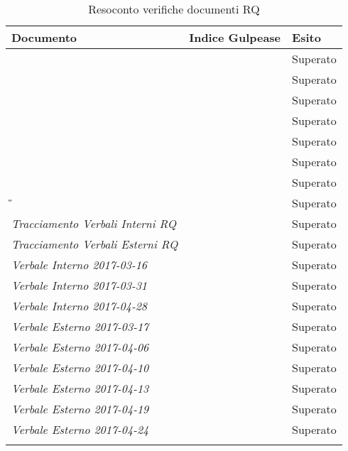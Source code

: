 			\begin{longtable}{|>{\centering\arraybackslash}p{5cm}|>{\centering\arraybackslash}p{5cm} | >{\centering\arraybackslash}p{5cm}|}
				\hline
				\rowcolor{Gray}
				\textbf{Documento} & \textbf{Indice Gulpease} & \textbf{Esito} \\
				\hline
				\textit{\DDP} &   & Superato\\
				\hline
				\textit{\MU} &   & Superato\\
				\hline
				\textit{\ST} &   & Superato\\
				\hline
				\textit{\NdP} &   & Superato\\
				\hline
				\textit{\PdP} &  & Superato \\
				\hline
				\textit{\PdQ} &   & Superato\\
				\hline
				\textit{\AdR} &   & Superato \\
				\hline
				\textit{\G}&  & Superato\\
				\hline
				\textit{Tracciamento Verbali Interni RQ}		& 		&	Superato	\\
				\hline
				\textit{Tracciamento Verbali Esterni RQ}		& 		&	Superato	\\
				\hline
				\textit{Verbale Interno 2017-03-16}		& 		&	Superato	\\
				\hline
				\textit{Verbale Interno 2017-03-31}		& 		&	Superato	\\
				\hline
				\textit{Verbale Interno 2017-04-28}		& 		&	Superato	\\
				\hline
				\textit{Verbale Esterno 2017-03-17}		& 		&	Superato	\\
				\hline
				\textit{Verbale Esterno 2017-04-06}		& 		&	Superato	\\
				\hline
				\textit{Verbale Esterno 2017-04-10}		& 		&	Superato	\\
				\hline
				\textit{Verbale Esterno 2017-04-13}		& 		&	Superato	\\
				\hline
				\textit{Verbale Esterno 2017-04-19}		& 		&	Superato	\\
				\hline
				\textit{Verbale Esterno 2017-04-24}		& 		&	Superato	\\
				\hline

			\caption{Resoconto verifiche documenti RQ}
		\end{longtable}
